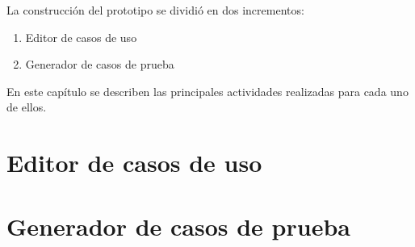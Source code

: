 	La construcción del prototipo se dividió en dos incrementos:
	\begin{enumerate}
		\item Editor de casos de uso
		\item Generador de casos de prueba
	\end{enumerate}
	
	 En este capítulo se describen las principales actividades realizadas para cada uno de ellos.
	
	\section{Editor de casos de uso}
	
	\section{Generador de casos de prueba}
	

	
	
	
	